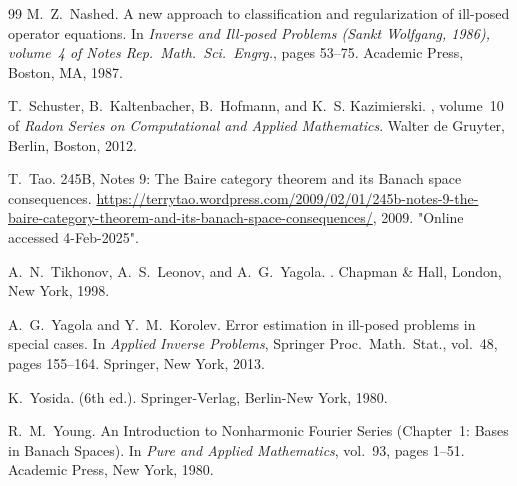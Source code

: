 \documentclass[12pt,twoside,reqno]{amsart}
\theoremstyle{definition}
\numberwithin{equation}{section}
\begin{document}
\begin{thebibliography}{99}
M.~Z.~Nashed.
\newblock A new approach to classification and regularization of ill-posed
  operator equations.
\newblock In {\em {I}nverse and {I}ll-posed {P}roblems ({S}ankt {W}olfgang,
  1986), volume~4 of Notes Rep.~Math.~Sci.~Engrg.}, pages 53--75. Academic
  Press, Boston, MA, 1987.

T.~Schuster, B.~Kaltenbacher, B.~Hofmann, and K.~S. Kazimierski.
, volume~10 of {\em
  Radon Series on Computational and Applied Mathematics}.
\newblock Walter de Gruyter, Berlin, Boston, 2012.

T.~Tao.
\newblock  245B, Notes 9: The Baire category theorem and its Banach space consequences.
\newblock \url{https://terrytao.wordpress.com/2009/02/01/245b-notes-9-the-baire-category-theorem-and-its-banach-space-consequences/}, 2009.
\newblock "Online accessed 4-Feb-2025".



A.~N.~Tikhonov, A.~S.~Leonov, and A.~G.~Yagola.
.
\newblock Chapman \& Hall, London, New York, 1998.


A.~G.~Yagola and Y.~M.~Korolev.
\newblock Error estimation in ill-posed problems in special cases.
\newblock In {\em Applied Inverse Problems}, Springer Proc.~Math.~Stat., vol.~48, pages 155--164.
\newblock Springer, New York, 2013.


K.~Yosida.
 (6th ed.).
\newblock Springer-Verlag, Berlin-New York, 1980.


R.~M.~Young.
\newblock An Introduction to Nonharmonic Fourier Series (Chapter~1: Bases in Banach Spaces).
\newblock In {\em Pure and Applied Mathematics}, vol.~93, pages 1--51.
\newblock Academic Press, New York, 1980.



\end{thebibliography}
\end{document}
